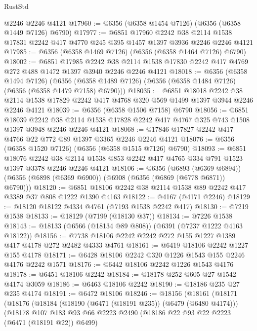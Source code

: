 \begin{lexlean}{RustStd}
\begin{coremodule}
    @2246
    @2246
    @4121
@17960 := @6356 (@6358 @1454 @7126) (@6356 (@6358 @1449 @7126) @6790)
@17977 := @6851
    @17960
    @2242
    @38
    @2114
    @1538
    @17831
    @2242
    @417
    @4770
    @245
    @395
    @1457
    @1397
    @3936
    @2246
    @2246
    @4121
@17985 := @6356 (@6358 @1469 @7126) (@6356 (@6358 @1464 @7126) @6790)
@18002 := @6851
    @17985
    @2242
    @38
    @2114
    @1538
    @17830
    @2242
    @417
    @4769
    @272
    @488
    @1472
    @1397
    @3940
    @2246
    @2246
    @4121
@18018 := @6356
    (@6358 @1494 @7126)
    (@6356 (@6358 @1489 @7126) (@6356 (@6358 @1484 @7126) (@6356 (@6358 @1479 @7158) @6790)))
@18035 := @6851
    @18018
    @2242
    @38
    @2114
    @1538
    @17829
    @2242
    @417
    @4768
    @320
    @569
    @1499
    @1397
    @3944
    @2246
    @2246
    @4121
@18039 := @6356 (@6358 @1506 @7158) @6790
@18056 := @6851
    @18039
    @2242
    @38
    @2114
    @1538
    @17828
    @2242
    @417
    @4767
    @325
    @743
    @1508
    @1397
    @3948
    @2246
    @2246
    @4121
@18068 := @17846 @17827 @2242 @417 @4766 @22 @772 @89 @1397 @3365 @2246 @2246 @4121
@18076 := @6356 (@6358 @1520 @7126) (@6356 (@6358 @1515 @7126) @6790)
@18093 := @6851
    @18076
    @2242
    @38
    @2114
    @1538
    @853
    @2242
    @417
    @4765
    @334
    @791
    @1523
    @1397
    @3378
    @2246
    @2246
    @4121
@18106 := @6356
    (@6893 (@6369 @6894))
    (@6356 (@6898 (@6369 @6900)) (@6908 (@6356 (@6869 (@6778 @6871)) @6790)))
@18120 := @6851 @18106 @2242 @38 @2114 @1538 @89 @2242 @417 @3389 @37 @808 @1222 @1390 @4163
@18122 := @4167 (@4171 @2246)
@18129 := @18120 @18122 @4334 @4761 (@7193 @1538 @2242 @417)
@18130 := @7219 @1538
@18133 := @18129 (@7199 (@18130 @37))
@18134 := @7226 @1538
@18143 := @18133 (@6566 (@18134 @89 @808)) (@6391 (@7237 @1222 @4163 @18122))
@18156 := @7738 @18106 @2242 @2242 @272 @155 @1227 @1389 @417 @4178 @272 @2482 @4333 @4761
@18161 := @6419 @18106 @2242 @1227 @155 @4178
@18171 := @6428 @18106 @2242 @320 @1226 @1543 @155 @2246 @4176 @2242 @1571
@18176 := @6442 @18106 @2242 @1226 @1543 @4176
@18178 := @6451 @18106 @2242
@18184 := @18178 @252 @605 @27 @1542 @4174 @3059
@18186 := @6463 @18106 @2242
@18190 := @18186 @235 @27 @235 @4174
@18191 := @6472 @18106
@18246 := @18156
    (@18161
      (@18171
        (@18176
          (@18184
            (@18190 (@6471 (@18191 @235)) (@6479 (@6480 @4174)))
            (@18178
              @107
              @183
              @93
              @66
              @2223
              @2490
              (@18186 @22 @93 @22 @2223 (@6471 (@18191 @22)) @6499)

\end{coremodule}
\end{lexlean}
